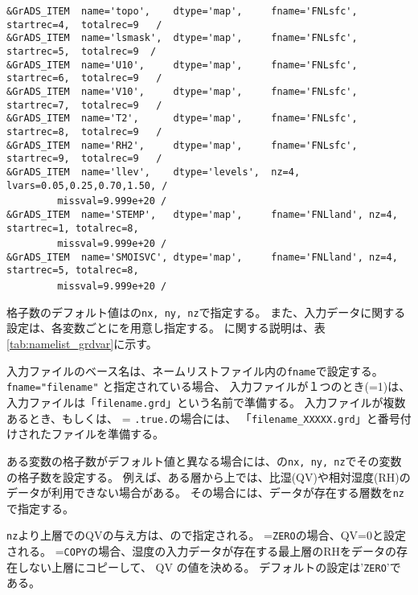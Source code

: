 {\verb|&GrADS_ITEM  name='topo',    dtype='map',     fname='FNLsfc', startrec=4,  totalrec=9   / |  \\
\verb|&GrADS_ITEM  name='lsmask',  dtype='map',     fname='FNLsfc', startrec=5,  totalrec=9  /  |  \\
\verb|&GrADS_ITEM  name='U10',     dtype='map',     fname='FNLsfc', startrec=6,  totalrec=9   / |  \\
\verb|&GrADS_ITEM  name='V10',     dtype='map',     fname='FNLsfc', startrec=7,  totalrec=9   / |  \\
\verb|&GrADS_ITEM  name='T2',      dtype='map',     fname='FNLsfc', startrec=8,  totalrec=9   / |  \\
\verb|&GrADS_ITEM  name='RH2',     dtype='map',     fname='FNLsfc', startrec=9,  totalrec=9   / |  \\
\verb|&GrADS_ITEM  name='llev',    dtype='levels',  nz=4, lvars=0.05,0.25,0.70,1.50, /        |  \\
~~~~~~~~\verb| missval=9.999e+20 /|  \\
\verb|&GrADS_ITEM  name='STEMP',   dtype='map',     fname='FNLland', nz=4, startrec=1, totalrec=8,|\\
~~~~~~~~\verb| missval=9.999e+20 /|  \\
\verb|&GrADS_ITEM  name='SMOISVC', dtype='map',     fname='FNLland', nz=4, startrec=5, totalrec=8,|\\
~~~~~~~~\verb| missval=9.999e+20 /|  \\
}


格子数のデフォルト値はの\verb|nx, ny, nz|で指定する。
また、入力データに関する設定は、各変数ごとにを用意し指定する。
に関する説明は、表\ref{tab:namelist_grdvar}に示す。

入力ファイルのベース名は、ネームリストファイル内の\verb|fname|で設定する。
\verb|fname="filename"| と指定されている場合、
入力ファイルが１つのとき(=1)は、入力ファイルは「\verb|filename.grd|」という名前で準備する。
入力ファイルが複数あるとき、もしくは、 = \verb|.true.|の場合には、
「\verb|filename_XXXXX.grd|」と番号付けされたファイルを準備する。

ある変数の格子数がデフォルト値と異なる場合には、の\verb|nx, ny, nz|でその変数の格子数を設定する。
例えば、ある層から上では、比湿(QV)や相対湿度(RH)のデータが利用できない場合がある。
その場合には、データが存在する層数を\verb|nz|で指定する。

\verb|nz|より上層でのQVの与え方は、ので指定される。
=\verb|ZERO|の場合、QV=0と設定される。
=\verb|COPY|の場合、湿度の入力データが存在する最上層のRHをデータの存在しない上層にコピーして、
QV の値を決める。
デフォルトの設定は'\verb|ZERO|'である。


